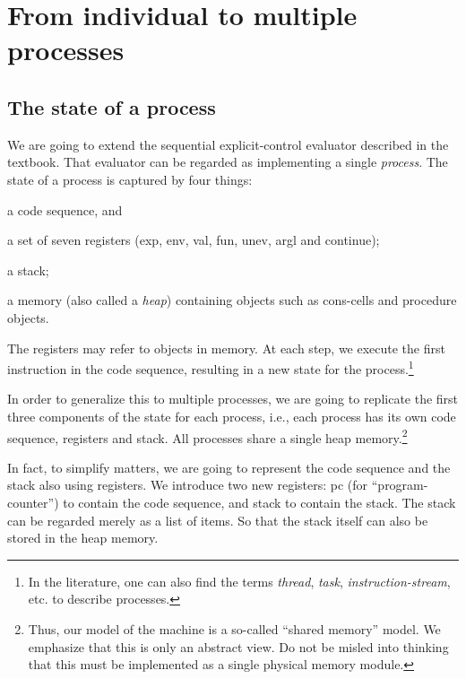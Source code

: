 \section{From individual to multiple processes}

\subsection{The state of a process}

We are going to extend the sequential explicit-control evaluator
described in the textbook.  That evaluator can be regarded as
implementing a single {\em process\/}.  The state of a process is
captured by four things:

 \begin{tightlist}

 \item a code sequence, and

 \item a set of seven registers ({\cf exp}, {\cf env}, {\cf val}, {\cf fun},
{\cf unev}, {\cf argl} and {\cf continue});

 \item a stack;

 \item a memory (also called a {\em heap\/}) containing
objects such as cons-cells and procedure objects.

 \end{tightlist}
 The registers may refer to objects in memory.  At
each step, we execute the first instruction in the code sequence,
resulting in a new state for the process.\footnote{ In the literature, one can also
find the terms {\em thread\/}, {\em task\/}, {\em
instruction-stream\/}, etc. to describe processes.  }

In order to generalize this to multiple processes, we are going to
replicate the first three components of the state for each process,
i.e., each process has its own code sequence, registers and stack.
All processes share a single heap memory.\footnote{ Thus, our model of
the machine is a so-called ``shared memory'' model.  We emphasize that
this is only an abstract view.  Do not be misled into thinking that
this must be implemented as a single physical memory module.  }

In fact, to simplify matters, we are going to represent the code
sequence and the stack also using registers.  We introduce two new
registers: {\cf pc} (for ``program-counter'') to contain the code
sequence, and {\cf stack} to contain the stack.  The stack can be
regarded merely as a list of items.  So that the stack itself can also
be stored in the heap memory.

